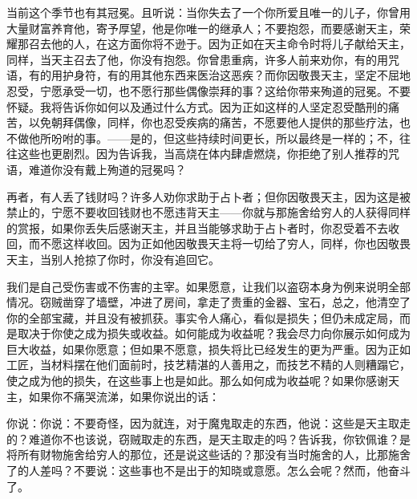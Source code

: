 当前这个季节也有其冠冕。且听说：当你失去了一个你所爱且唯一的儿子，你曾用大量财富养育他，寄予厚望，他是你唯一的继承人；不要抱怨，而要感谢天主，荣耀那召去他的人，在这方面你将不逊于。因为正如在天主命令时将儿子献给天主，同样，当天主召去了他，你没有抱怨。你曾患重病，许多人前来劝你，有的用咒语，有的用护身符，有的用其他东西来医治这恶疾？而你因敬畏天主，坚定不屈地忍受，宁愿承受一切，也不愿行那些偶像崇拜的事？这给你带来殉道的冠冕。不要怀疑。我将告诉你如何以及通过什么方式。因为正如这样的人坚定忍受酷刑的痛苦，以免朝拜偶像，同样，你也忍受疾病的痛苦，不愿要他人提供的那些疗法，也不做他所吩咐的事。——是的，但这些持续时间更长，所以最终是一样的；不，往往这些也更剧烈。因为告诉我，当高烧在体内肆虐燃烧，你拒绝了别人推荐的咒语，难道你没有戴上殉道的冠冕吗？\par

再者，有人丢了钱财吗？许多人劝你求助于占卜者；但你因敬畏天主，因为这是被禁止的，宁愿不要收回钱财也不愿违背天主——你就与那施舍给穷人的人获得同样的赏报，如果你丢失后感谢天主，并且当能够求助于占卜者时，你忍受着不去收回，而不愿这样收回。因为正如他因敬畏天主将一切给了穷人，同样，你也因敬畏天主，当别人抢掠了你时，你没有追回它。\par

我们是自己受伤害或不伤害的主宰。如果愿意，让我们以盗窃本身为例来说明全部情况。窃贼凿穿了墙壁，冲进了房间，拿走了贵重的金器、宝石，总之，他清空了你的全部宝藏，并且没有被抓获。事实令人痛心，看似是损失；但仍未成定局，而是取决于你使之成为损失或收益。如何能成为收益呢？我会尽力向你展示如何成为巨大收益，如果你愿意；但如果不愿意，损失将比已经发生的更为严重。因为正如工匠，当材料摆在他们面前时，技艺精湛的人善用之，而技艺不精的人则糟蹋它，使之成为他的损失，在这些事上也是如此。那么如何成为收益呢？如果你感谢天主，如果你不痛哭流涕，如果你说出的话：\par

你说：你说：不要奇怪，因为就连，对于魔鬼取走的东西，他说：这些是天主取走的？难道你不也该说，窃贼取走的东西，是天主取走的吗？告诉我，你钦佩谁？是将所有财物施舍给穷人的那位，还是说这些话的？那没有当时施舍的人，比那施舍了的人差吗？不要说：这些事也不是出于的知晓或意愿。怎么会呢？然而，他奋斗了。\par

